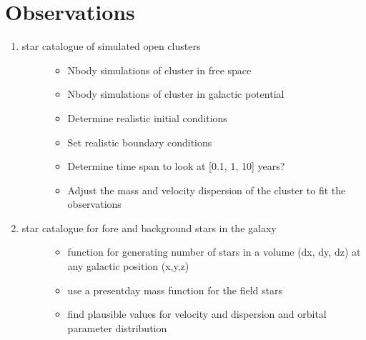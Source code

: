 \documentclass[letterpaper,10pt,english]{sphinxmanual}
\begin{document}
\section{Observations}
\label{\detokenize{Project_Overview/Tasks:observations}}\begin{enumerate}
%
\item {} \begin{description}
\item[{star catalogue of simulated open clusters}] \leavevmode\begin{itemize}
\item {} 
\sphinxAtStartPar
N\sphinxhyphen{}body simulations of cluster in free space

\item {} 
\sphinxAtStartPar
N\sphinxhyphen{}body simulations of cluster in galactic potential

\item {} 
\sphinxAtStartPar
Determine realistic initial conditions

\item {} 
\sphinxAtStartPar
Set realistic boundary conditions

\item {} 
\sphinxAtStartPar
Determine time span to look at \sphinxhyphen{} {[}0.1, 1, 10{]} years?

\item {} 
\sphinxAtStartPar
Adjust the mass and velocity dispersion of the cluster to fit the observations

\end{itemize}

\end{description}

\item {} \begin{description}
\item[{star catalogue for fore\sphinxhyphen{} and background stars in the galaxy}] \leavevmode\begin{itemize}
\item {} 
\sphinxAtStartPar
function for generating number of stars in a volume (dx, dy, dz)
at any galactic position (x,y,z)

\item {} 
\sphinxAtStartPar
use a present\sphinxhyphen{}day mass function for the field stars

\item {} 
\sphinxAtStartPar
find plausible values for velocity and dispersion and orbital parameter distribution


\end{itemize}
\end{description}
\end{enumerate}
\end{document}
